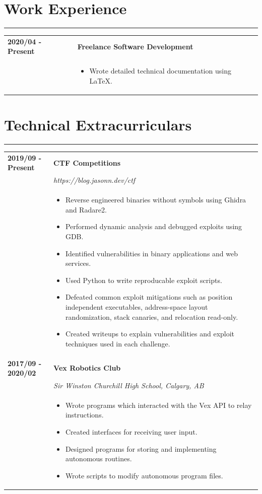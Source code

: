 \documentclass[letterpaper]{article}
\newcommand{\sect}[1]{\section*{#1}
                        {\color{cyan}
                        \rule{\textwidth}{1pt}
                        \vspace{-1ex}}}
\begin{document}
    \sect{Work Experience}

        \begin{tabular}{p{} p{}}
            \textbf{2020/04 - Present} & \textbf{Freelance Software Development} \\
            & \begin{itemize}
                \item Wrote detailed technical documentation using LaTeX.
            \end{itemize}
        \end{tabular}

    \sect{Technical Extracurriculars}

        \begin{tabular}{p{} p{}}
            \textbf{2019/09 - Present} & \textbf{CTF Competitions} \\
            & \emph{https://blog.jasonn.dev/ctf} \\
            & \begin{itemize}
                \item Reverse engineered binaries without symbols using Ghidra and Radare2.
                \item Performed dynamic analysis and debugged exploits using GDB.
                \item Identified vulnerabilities in binary applications and web services.
                \item Used Python to write reproducable exploit scripts.
                \item Defeated common exploit mitigations such as position independent executables, address-space layout randomization, stack canaries, and relocation read-only.
                \item Created writeups to explain vulnerabilities and exploit techniques used in each challenge.
            \end{itemize}
            \\
            \textbf{2017/09 - 2020/02} & \textbf{Vex Robotics Club} \\
            & \emph{Sir Winston Churchill High School, Calgary, AB} \\
            & \begin{itemize}
                \item Wrote programs which interacted with the Vex API to relay instructions.
                \item Created interfaces for receiving user input.
                \item Designed programs for storing and implementing autonomous routines.
                \item Wrote scripts to modify autonomous program files.
            \end{itemize}
        \end{tabular}
\end{document}
